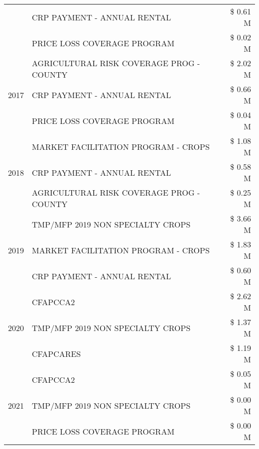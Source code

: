 \begin{tabular}{llr}
 & CRP PAYMENT - ANNUAL RENTAL & \$ 0.61 M \\
 & PRICE LOSS COVERAGE PROGRAM & \$ 0.02 M \\
\cline{1-3}
\multirow[t]{3}{*}{2017} & AGRICULTURAL RISK COVERAGE PROG - COUNTY & \$ 2.02 M \\
 & CRP PAYMENT - ANNUAL RENTAL & \$ 0.66 M \\
 & PRICE LOSS COVERAGE PROGRAM & \$ 0.04 M \\
\cline{1-3}
\multirow[t]{3}{*}{2018} & MARKET FACILITATION PROGRAM - CROPS & \$ 1.08 M \\
 & CRP PAYMENT - ANNUAL RENTAL & \$ 0.58 M \\
 & AGRICULTURAL RISK COVERAGE PROG - COUNTY & \$ 0.25 M \\
\cline{1-3}
\multirow[t]{3}{*}{2019} & TMP/MFP 2019 NON SPECIALTY CROPS & \$ 3.66 M \\
 & MARKET FACILITATION PROGRAM - CROPS & \$ 1.83 M \\
 & CRP PAYMENT - ANNUAL RENTAL & \$ 0.60 M \\
\cline{1-3}
\multirow[t]{3}{*}{2020} & CFAPCCA2 & \$ 2.62 M \\
 & TMP/MFP 2019 NON SPECIALTY CROPS & \$ 1.37 M \\
 & CFAPCARES & \$ 1.19 M \\
\cline{1-3}
\multirow[t]{3}{*}{2021} & CFAPCCA2 & \$ 0.05 M \\
 & TMP/MFP 2019 NON SPECIALTY CROPS & \$ 0.00 M \\
 & PRICE LOSS COVERAGE PROGRAM & \$ 0.00 M \\
\cline{1-3}
\bottomrule
\end{tabular}
